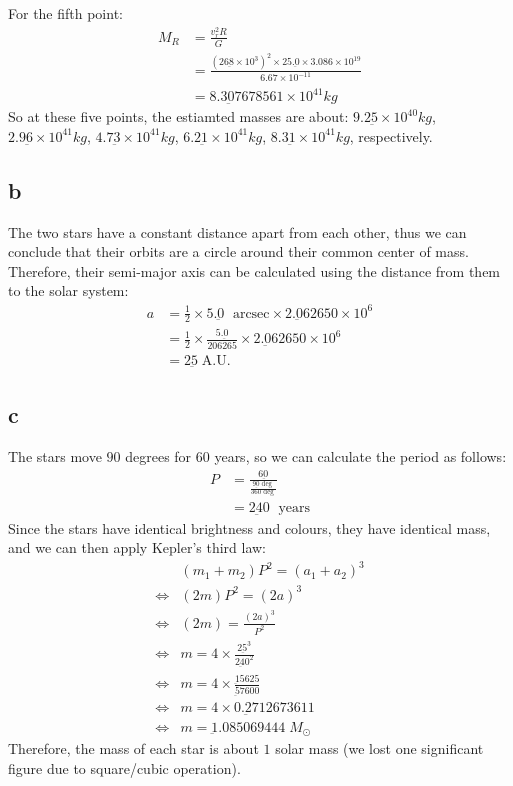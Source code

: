 \documentclass[11pt]{article}
\newcommand{\sci}[1]{\times 10^{#1}}
\begin{document}
For the fifth point:
$$
\begin{aligned}
M_R &= \frac{v_r^2 R}{G} \\
&= \frac{(26\underbar{8} \sci{3})^2 \times 25.\underbar{0} \times 3.086 \sci{19}}{6.67 \sci{-11}}\\
&= 8.3\underbar{0}7678561 \sci{41} kg
\end{aligned}
$$
So at these five points, the estiamted masses are about:
$9.2\underbar{5} \sci{40} kg$,
$2.9\underbar{6} \sci{41} kg$,
$4.7\underbar{3} \sci{41} kg$,
$6.2\underbar{1} \sci{41} kg$,
$8.3\underbar{1} \sci{41} kg$,
respectively.
\subsection*{b}
The two stars have a constant distance apart from each other, 
thus we can conclude that their orbits are a circle around their common center of mass.
Therefore, their semi-major axis can be calculated using the distance from them to the solar system:
$$
\begin{aligned}
    a &= \frac{1}{2} \times 5.\underbar{0} \; \text{ arcsec} \times 2.\underbar{0}62650 \sci{6} \\
    &= \frac{1}{2} \times \frac{5.\underbar{0}}{206265} \times 2.\underbar{0}62650 \sci{6} \\
    &= 2\underbar{5} \; \text{A.U.}
\end{aligned}
$$
\subsection*{c}
The stars move $90$ degrees for $60$ years, so we can calculate the period as follows:
$$
\begin{aligned}
    P &= \frac{6\underbar{0}}{\frac{9\underbar{0} \deg}{360 \deg}}  \\
    &= 2\underbar{4}0 \; \text{ years}
\end{aligned}
$$
Since the stars have identical brightness and colours, they have identical mass, and we can then apply Kepler's third law:
$$
\begin{aligned}
    &(m_1 + m_2) P^2 = (a_1 + a_2)^3 \\
    \iff &(2m) P^2 = (2a)^3 \\
    \iff &(2m) = \frac{(2a)^3}{P^2}\\
    \iff & m = 4 \times \frac{2\underbar{5}^3}{2\underbar{4}0^2}\\
    \iff & m = 4 \times \frac{\underbar{1}5625}{\underbar{5}7600} \\
    \iff & m = 4 \times 0.\underbar{2}712673611 \\
    \iff & m = \underbar{1}.085069444 \; M_{\odot}
\end{aligned}
$$
Therefore, the mass of each star is about $1$ solar mass (we lost one significant figure due to square/cubic operation).
\end{document}
